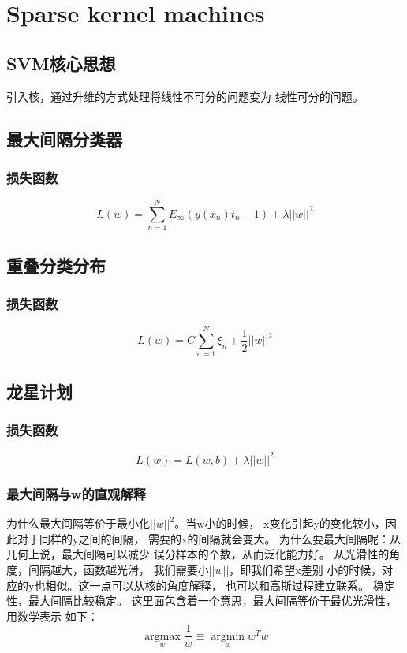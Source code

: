 \chapter{Sparse kernel machines}
\label{sparse_kernel_machines}

\section{SVM核心思想}
引入核，通过升维的方式处理将线性不可分的问题变为
线性可分的问题。

\section{最大间隔分类器}
\subsection{损失函数}
\begin{equation}
L(w) = \sum_{n=1}^N E_\infty(y(x_n)t_n - 1) + \lambda||w||^2
\end{equation}
\section{重叠分类分布}

\subsection{损失函数}
\begin{equation}
L(w) = C\sum_{n=1}^N\xi_n + \frac{1}{2}||w||^2
\end{equation}

\section{龙星计划}
\subsection{损失函数}
\begin{equation} 
L(w) = L(w, b) + \lambda||w||^2
\end{equation}

\subsection{最大间隔与w的直观解释}
为什么最大间隔等价于最小化$||w||^2$。当w小的时候，
x变化引起y的变化较小，因此对于同样的y之间的间隔，
需要的x的间隔就会变大。
为什么要最大间隔呢：从几何上说，最大间隔可以减少
误分样本的个数，从而泛化能力好。
从光滑性的角度，间隔越大，函数越光滑，
我们需要小$||w||$，即我们希望x差别
小的时候，对应的y也相似。这一点可以从核的角度解释，
也可以和高斯过程建立联系。
稳定性，最大间隔比较稳定。
这里面包含着一个意思，最大间隔等价于最优光滑性，用数学表示
如下：
\begin{equation}
\underset{w}{\operatorname{arg max}}\frac{1}{w}
\equiv \underset{w}{\operatorname{arg min}}w^Tw
\end{equation}

